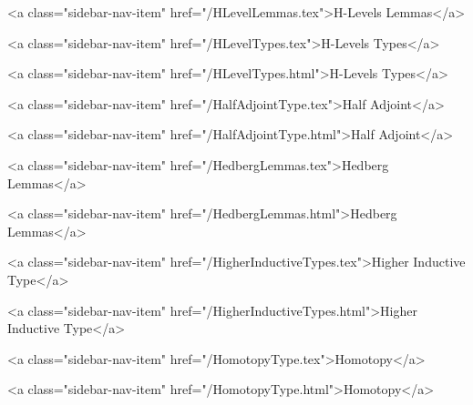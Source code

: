       
        
          <a class="sidebar-nav-item" href="/HLevelLemmas.tex">H-Levels Lemmas</a>
        
      
    
      
        
          <a class="sidebar-nav-item" href="/HLevelTypes.tex">H-Levels Types</a>
        
      
    
      
        
          <a class="sidebar-nav-item" href="/HLevelTypes.html">H-Levels Types</a>
        
      
    
      
        
          <a class="sidebar-nav-item" href="/HalfAdjointType.tex">Half Adjoint</a>
        
      
    
      
        
          <a class="sidebar-nav-item" href="/HalfAdjointType.html">Half Adjoint</a>
        
      
    
      
        
          <a class="sidebar-nav-item" href="/HedbergLemmas.tex">Hedberg Lemmas</a>
        
      
    
      
        
          <a class="sidebar-nav-item" href="/HedbergLemmas.html">Hedberg Lemmas</a>
        
      
    
      
        
          <a class="sidebar-nav-item" href="/HigherInductiveTypes.tex">Higher Inductive Type</a>
        
      
    
      
        
          <a class="sidebar-nav-item" href="/HigherInductiveTypes.html">Higher Inductive Type</a>
        
      
    
      
        
          <a class="sidebar-nav-item" href="/HomotopyType.tex">Homotopy</a>
        
      
    
      
        
          <a class="sidebar-nav-item" href="/HomotopyType.html">Homotopy</a>
        
